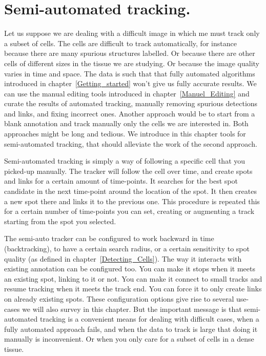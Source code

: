 \section{Semi-automated tracking.}

Let us suppose we are dealing with a difficult image in which me must track only a subset of cells. 
The cells are difficult to track automatically, for instance because there are many spurious structures labelled. 
Or because there are other cells of different sizes in the tissue we are studying. 
Or because the image quality varies in time and space. 
The data is such that that fully automated algorithms introduced in chapter~\ref{Getting_started} won't give us fully accurate results. 
We can use the manual editing tools introduced in chapter~\ref{Manuel_Editing} and curate the results of automated tracking, manually removing spurious detections and links, and fixing incorrect ones. 
Another approach would be to start from a blank annotation and track manually only the cells we are interested in. 
Both approaches might be long and tedious. 
We introduce in this chapter tools for semi-automated tracking, that should alleviate the work of the second approach.

Semi-automated tracking is simply a way of following a specific cell that you picked-up manually. 
The tracker will follow the cell over time, and create spots and links for a certain amount of time-points.
It searches for the best spot candidate in the next time-point around the location of the spot.
It then creates a new spot there and links it to the previous one.
This procedure is repeated this for a certain number of time-points you can set, creating or augmenting a track starting from the spot you selected.

The semi-auto tracker can be configured to work backward in time (backtracking), to have a certain search radius, or a certain sensitivity to spot quality (as defined in chapter~\ref{Detecting_Cells}).
The way it interacts with existing annotation can be configured too. 
You can make it stops when it meets an existing spot, linking to it or not.
You can make it connect to small tracks and resume tracking when it meets the track end.
You can force it to only create links on already existing spots. 
These configuration options give rise to several use-cases we will also survey in this chapter.
But the important message is that semi-automated tracking is a convenient means for dealing with difficult cases, when a fully automated approach fails, and when the data to track is large that doing it manually is inconvenient.
Or when you only care for a subset of cells in a dense tissue.

